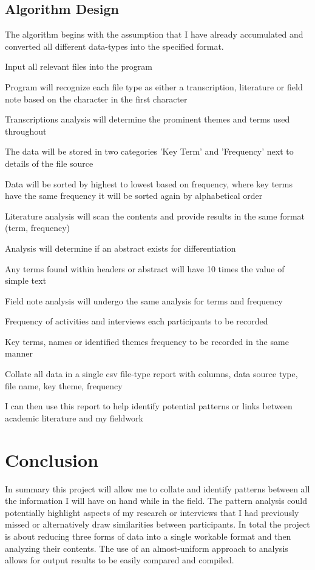 \documentclass{article}
\begin{document}
\subsection{Algorithm Design}
The algorithm begins with the assumption that I have already accumulated and converted all different data-types into the specified format.
\begin{enumerate}
    \item Input all relevant files into the program
    \item Program will recognize each file type as either a transcription, literature or field note based on the character in the first character
    \item Transcriptions analysis will determine the prominent themes and terms used throughout
    {\setlength\itemindent{25pt}\item The data will be stored in two categories 'Key Term' and 'Frequency' next to details of the file source}
    {\setlength\itemindent{25pt}\item Data will be sorted by highest to lowest based on frequency, where key terms have the same frequency it will be sorted again by alphabetical order} 
    \item Literature analysis will scan the contents and provide results in the same format (term, frequency)
    {\setlength\itemindent{25pt}\item Analysis will determine if an abstract exists for differentiation}
    {\setlength\itemindent{25pt}\item Any terms found within headers or abstract will have 10 times the value of simple text}
    \item Field note analysis will undergo the same analysis for terms and frequency
    {\setlength\itemindent{25pt}\item Frequency of activities and interviews each participants to be recorded}
    {\setlength\itemindent{25pt}\item Key terms, names or identified themes frequency to be recorded in the same manner}
    \item Collate all data in a single csv file-type report with columns, data source type, file name, key theme, frequency
    \item I can then use this report to help identify potential patterns or links between academic literature and my fieldwork

    
\section{Conclusion}
In summary this project will allow me to collate and identify patterns between all the information I will have on hand while in the field. The pattern analysis could potentially highlight aspects of my research or interviews that I had previously missed or alternatively draw similarities between participants. In total the project is about reducing three forms of data into a single workable format and then analyzing their contents. The use of an almost-uniform approach to analysis allows for output results to be easily compared and compiled. 
    
\end{enumerate}
\end{document}
